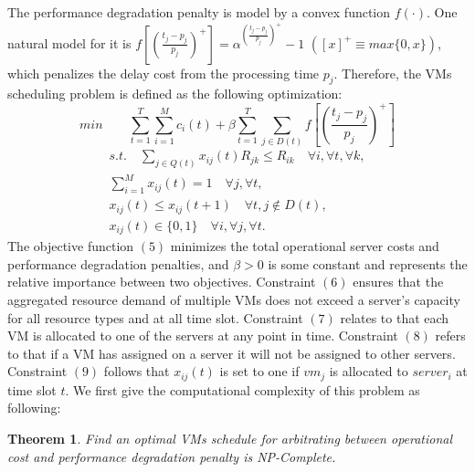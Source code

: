 \documentclass[10pt,journal]{IEEEtran}
\begin{document}
The performance degradation penalty is model by a convex function $f(\cdot)$. One natural model for it is $f[(\frac{t_j-p_j}{p_j})^+]=\alpha^{(\frac{t_j-p_j}{p_j})^+}-1$ $([x]^+{\equiv}max\{0, x\})$, which penalizes the delay cost from the processing time $p_j$. Therefore, the VMs scheduling problem is defined as the following optimization:
\begin{equation}
min \qquad \sum\limits_{t=1}^T\sum\limits_{i=1}^{M}c_i(t)+\beta \sum\limits_{t=1}^{T}\sum_{j{\in}D(t)}f[(\frac{t_j-p_j}{p_j})^+]
\end{equation}
\begin{eqnarray}
s.t.\quad \sum_{j{\in}Q(t)}x_{ij}(t)R_{jk}{\leq}R_{ik} \quad \forall{i},\forall{t},\forall{k},\\
\sum_{i=1}^Mx_{ij}(t)=1 \quad \forall{j},\forall{t},\\
x_{ij}(t){\leq}x_{ij}(t+1) \quad \forall{t},j{\notin}D(t),\\
x_{ij}(t){\in}\{0,1\} \quad \forall{i},\forall{j},\forall{t}.
\end{eqnarray}
The objective function $(5)$ minimizes the total operational server costs and performance degradation penalties, and $\beta>0$ is some constant and represents the relative importance between two objectives. Constraint $(6)$ ensures that the aggregated resource demand of multiple VMs does not exceed a server's capacity for all resource types and at all time slot. Constraint $(7)$ relates to that each VM is allocated to one of the servers at any point in time. Constraint $(8)$ refers to that if a VM has assigned on a server it will not be assigned to other servers. Constraint $(9)$ follows that $x_{ij}(t)$ is set to one if $vm_j$ is allocated to $server_i$ at time slot $t$. We first give the computational complexity of this problem as following:
\newtheorem{theorem}{Theorem}
\begin{theorem}
Find an optimal VMs schedule for arbitrating between operational cost and performance degradation penalty is NP-Complete. \label{theorem:hardness}
\end{theorem}
\end{document}
